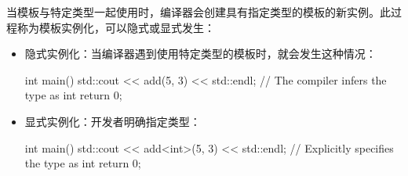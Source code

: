 当模板与特定类型一起使用时，编译器会创建具有指定类型的模板的新实例。此过程称为模板实例化，可以隐式或显式发生：

\begin{itemize}
\item
隐式实例化：当编译器遇到使用特定类型的模板时，就会发生这种情况：

\begin{cpp}
int main() {
    std::cout << add(5, 3) << std::endl; // The compiler infers the type as int
    return 0;
}
\end{cpp}

\item
显式实例化：开发者明确指定类型：

\begin{cpp}
int main() {
    std::cout << add<int>(5, 3) << std::endl; // Explicitly specifies the type as int
    return 0;
}
\end{cpp}
\end{itemize}
